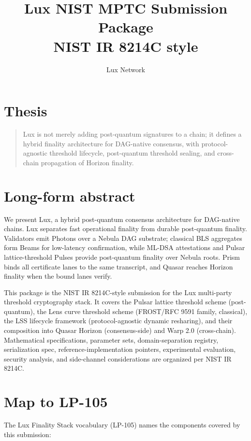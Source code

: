 \documentclass[11pt]{article}
\title{Lux NIST MPTC Submission Package\\\large NIST IR 8214C style}
\author{Lux Network}
\date{}
\begin{document}
\luxcoverpage
\maketitle

\section*{Thesis}

\begin{quote}
Lux is not merely adding post-quantum signatures to a chain; it defines a hybrid
finality architecture for DAG-native consensus, with protocol-agnostic threshold
lifecycle, post-quantum threshold sealing, and cross-chain propagation of Horizon
finality.
\end{quote}

\section*{Long-form abstract}

We present Lux, a hybrid post-quantum consensus architecture for DAG-native
chains. Lux separates fast operational finality from durable post-quantum
finality. Validators emit Photons over a Nebula DAG substrate; classical BLS
aggregates form Beams for low-latency confirmation, while ML-DSA attestations
and Pulsar lattice-threshold Pulses provide post-quantum finality over Nebula
roots. Prism binds all certificate lanes to the same transcript, and Quasar
reaches Horizon finality when the bound lanes verify.

This package is the NIST IR 8214C-style submission for the Lux multi-party
threshold cryptography stack. It covers the Pulsar lattice threshold scheme
(post-quantum), the Lens curve threshold scheme (FROST/RFC 9591 family,
classical), the LSS lifecycle framework (protocol-agnostic dynamic resharing),
and their composition into Quasar Horizon (consensus-side) and Warp 2.0
(cross-chain). Mathematical specifications, parameter sets, domain-separation
registry, serialization spec, reference-implementation pointers, experimental
evaluation, security analysis, and side-channel considerations are organized
per NIST IR 8214C.

\section*{Map to LP-105}

The Lux Finality Stack vocabulary (LP-105) names the components covered by
this submission:
\end{document}
